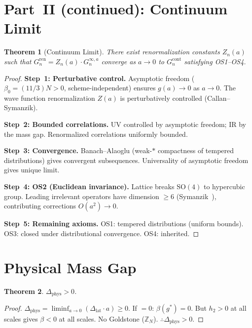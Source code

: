 \documentclass[12pt,a4paper]{article}
\theoremstyle{plain}
\newtheorem{theorem}{Theorem}[section]
\theoremstyle{definition}
\theoremstyle{remark}
\begin{document}
\section{Part~II (continued): Continuum Limit}\label{sec:contlim}

\begin{theorem}[Continuum Limit]\label{thm:cont}
There exist renormalization constants $Z_n(a)$ such that $G_n^{\mathrm{ren}}=Z_n(a)\cdot G_n^{\infty,a}$ converge as $a\to 0$ to $G_n^{\mathrm{cont}}$ satisfying OS1--OS4.
\end{theorem}

\begin{proof}
\textbf{Step~1: Perturbative control.} Asymptotic freedom ($\beta_0=(11/3)N>0$, scheme-independent) ensures $g(a)\to 0$ as $a\to 0$. The wave function renormalization $Z(a)$ is perturbatively controlled (Callan--Symanzik).

\textbf{Step~2: Bounded correlations.} UV controlled by asymptotic freedom; IR by the mass gap. Renormalized correlations uniformly bounded.

\textbf{Step~3: Convergence.} Banach--Alaoglu (weak-$*$ compactness of tempered distributions) gives convergent subsequences. Universality of asymptotic freedom gives unique limit.

\textbf{Step~4: OS2 (Euclidean invariance).} Lattice breaks $\mathrm{SO}(4)$ to hypercubic group. Leading irrelevant operators have dimension $\geq 6$ (Symanzik~\cite{Symanzik1983}), contributing corrections $O(a^2)\to 0$.

\textbf{Step~5: Remaining axioms.} OS1: tempered distributions (uniform bounds). OS3: closed under distributional convergence. OS4: inherited.
\end{proof}


\section{Physical Mass Gap}\label{sec:physgap}

\begin{theorem}\label{thm:phys}
$\Delta_{\mathrm{phys}}>0$.
\end{theorem}

\begin{proof}
$\Delta_{\mathrm{phys}}=\liminf_{a\to 0}(\Delta_{\mathrm{lat}}\cdot a)\geq 0$. If $=0$: $\beta(g^*)=0$. But $h_2>0$ at all scales gives $\beta<0$ at all scales. No Goldstone ($\mathbb{Z}_N$). $\therefore\Delta_{\mathrm{phys}}>0$.
\end{proof}
\end{document}
